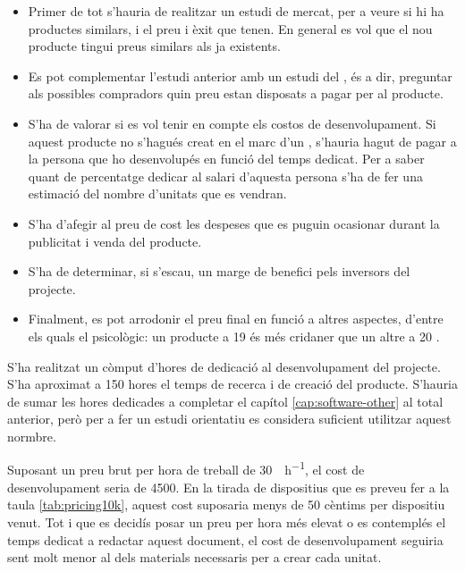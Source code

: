 \begin{itemize}
    \item Primer de tot s'hauria de realitzar un estudi de mercat, per a veure
    si hi ha productes similars, i el preu i èxit que tenen. En general es vol
    que el nou producte tingui preus similars als ja existents.
    \item Es pot complementar l'estudi anterior amb un estudi del ,
    és a dir, preguntar als possibles compradors quin preu estan disposats a
    pagar per al producte.
    \item S'ha de valorar si es vol tenir en compte els costos de
    desenvolupament. Si aquest producte no s'hagués creat en el marc d'un ,
    s'hauria hagut de pagar a la persona que ho desenvolupés en funció del
    temps dedicat. Per a saber quant de percentatge dedicar al salari d'aquesta
    persona s'ha de fer una estimació del nombre d'unitats que es vendran.
    \item S'ha d'afegir al preu de cost les despeses que es puguin ocasionar
    durant la publicitat i venda del producte.
    \item S'ha de determinar, si s'escau, un marge de benefici pels inversors
    del projecte.
    \item Finalment, es pot arrodonir el preu final en funció a altres aspectes,
    d'entre els quals el psicològic: un producte a
    \SI[round-mode=places,round-precision=0]{19}{\EUR} és més cridaner que un
    altre a \SI[round-mode=places,round-precision=0]{20}{\EUR}
    \cite{kumar2017impact}.
\end{itemize}

S'ha realitzat un còmput d'hores de dedicació al desenvolupament del projecte.
S'ha aproximat a 150 hores el temps de recerca i de creació del producte.
S'hauria de sumar les hores dedicades a completar el capítol
\ref{cap:software-other} al total anterior, però per a fer un estudi orientatiu
es considera suficient utilitzar aquest normbre.

Suposant un preu brut per hora de treball de
\SI[round-mode=places,round-precision=0]{30}{\EUR\per\hour}, el cost de
desenvolupament seria de \SI[round-mode=places,round-precision=0]{4500}{\EUR}.
En la tirada de dispositius que es preveu fer a la taula \ref{tab:pricing10k},
aquest cost suposaria menys de 50 cèntims per dispositiu venut. Tot i que es
decidís posar un preu per hora més elevat o es contemplés el temps dedicat a
redactar aquest document, el cost de desenvolupament seguiria sent molt menor
al dels materials necessaris per a crear cada unitat.

